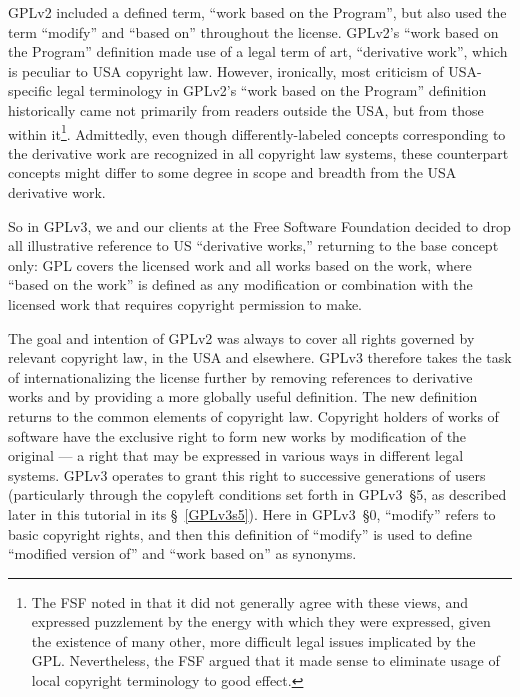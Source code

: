 
GPLv2 included a defined term, ``work based on the Program'', but also used
the term ``modify'' and ``based on'' throughout the license.  GPLv2's ``work
based on the Program'' definition made use of a legal term of art,
``derivative work'', which is peculiar to USA copyright law.  However,
ironically, most criticism of USA-specific legal terminology in GPLv2's
``work based on the Program'' definition historically came not primarily from
readers outside the USA, but from those within it\footnote{The FSF noted in
  that it did not generally agree with these views, and expressed puzzlement
  by the energy with which they were expressed, given the existence of many
  other, more difficult legal issues implicated by the GPL.  Nevertheless,
  the FSF argued that it made sense to eliminate usage of local copyright
  terminology to good effect.}.  Admittedly, even though differently-labeled
concepts corresponding to the derivative work are recognized in all copyright
law systems, these counterpart concepts might differ to some degree in scope
and breadth from the USA derivative work.


So in GPLv3, we and our clients at the Free Software Foundation
decided to drop all illustrative reference to US ``derivative works,''
returning to the base concept only: GPL covers the licensed work and all
works based on the work, where ``based on the work'' is defined as any
modification or combination with the licensed work that requires copyright
permission to make.

The goal and intention of GPLv2 was always to cover all rights governed by
relevant copyright law, in the USA and elsewhere.  GPLv3 therefore takes the
task of internationalizing the license further by removing references to
derivative works and by providing a more globally useful definition.  The new
definition returns to the common elements of copyright law.  Copyright
holders of works of software have the exclusive right to form new works by
modification of the original --- a right that may be expressed in various
ways in different legal systems.  GPLv3 operates to grant this right to
successive generations of users (particularly through the copyleft conditions
set forth in GPLv3~\S5, as described later in this tutorial in its
\S~\ref{GPLv3s5}).  Here in GPLv3~\S0, ``modify'' refers to basic copyright
rights, and then this definition of ``modify'' is used to define ``modified
version of'' and ``work based on'' as synonyms.

